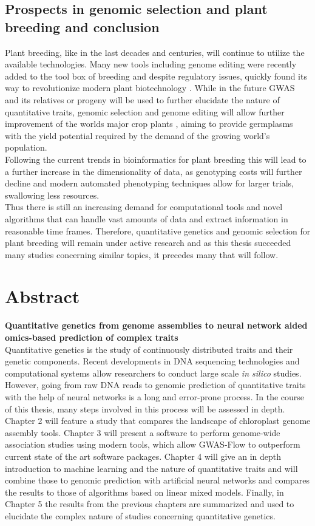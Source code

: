 \section{Prospects in genomic selection and plant breeding and conclusion}
Plant breeding, like in the last decades and centuries, will continue to utilize the
available technologies. Many new tools including genome editing were recently added to the
tool box of breeding and despite regulatory issues, quickly found its way to
revolutionize modern plant biotechnology \cite{araki2015towards}. While in the future GWAS
and its relatives or progeny will be used to further elucidate the nature of quantitative
traits, genomic selection and genome editing will allow further improvement of the worlds
major crop plants \cite{rodriguez2017engineering}, aiming to provide germplasms with the
yield
potential required by the demand of the growing world's population.\\
Following the current trends in bioinformatics for plant breeding this will lead to a
further increase in the dimensionality of data, as genotyping costs will further decline
and modern automated phenotyping techniques allow for larger trials, swallowing less
resources. \\
Thus there is still an increasing demand for computational tools and novel algorithms that
can handle vast amounts of data and extract information in reasonable time
frames. Therefore, quantitative genetics and genomic selection for plant breeding will
remain under active research and as this thesis succeeded many studies concerning similar
topics, it precedes many that will follow.


\chapter{Abstract} %
\textbf{Quantitative genetics from genome assemblies to neural network aided omics-based prediction of complex traits}\\
Quantitative genetics is the study of continuously distributed traits and their genetic
components. Recent developments in DNA sequencing technologies and computational systems
allow researchers to conduct large scale \textit{in silico} studies. However, going from
raw DNA reads to genomic prediction of quantitative traits with the help of neural
networks is a long and error-prone process. In the course of this thesis, many steps
involved in this process will be assessed in depth. Chapter 2 will feature a study that
compares the landscape of chloroplast genome assembly tools. Chapter 3 will present a
software to perform genome-wide association studies using modern tools, which allow
GWAS-Flow to outperform current state of the art software packages. Chapter 4 will give an
in depth introduction to machine learning and the nature of quantitative traits and will
combine those to genomic prediction with artificial neural networks and compares the
results to those of algorithms based on linear mixed models. Finally, in Chapter 5 the
results from the previous chapters are summarized and used to elucidate the complex nature
of studies concerning quantitative genetics.

